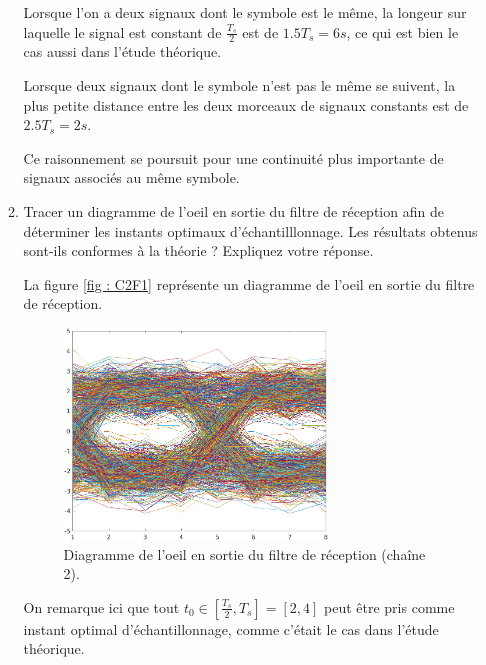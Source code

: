 \documentclass[frenchb]{article}
\begin{document}
\begin{enumerate}
\begin{enumerate}
				 Lorsque l'on a deux signaux dont le symbole est le même, la longeur sur laquelle le signal est constant de $\frac{T_s}{2}$ est de $1.5 T_s = 6s$, ce qui est bien le cas aussi dans l'étude théorique.
				 
                Lorsque deux signaux dont le symbole n'est pas le même se suivent, la plus petite distance entre les deux morceaux de signaux constants est de $2.5 T_s = 2s$.
                
				Ce raisonnement se poursuit pour une continuité plus importante de signaux associés au même symbole. 
				 \par\leavevmode\par
                \item Tracer un diagramme de l'oeil en sortie du filtre de réception afin de déterminer les instants optimaux d'échantilllonnage. Les résultats obtenus sont-ils conformes à la théorie ? Expliquez votre réponse.
                \par\leavevmode\par
       			 \setlength\parindent{0.5cm}
        		 La figure \ref{fig : C2F1} représente  un diagramme de l'oeil en sortie du filtre de réception.
        
                 \begin{figure}[ht!]
		         \centering
		         \includegraphics[width=7cm]{C2F2.png}		              			     \caption{Diagramme de l'oeil en sortie du filtre de réception (chaîne 2). \label{fig : C2F2}}
		         \end{figure}
		        
		        \newpage
				 On remarque ici que tout $t_0 \in \left[\frac{T_s}{2}, T_s\right] = \left[2, 4\right]$ peut être pris comme instant optimal d'échantillonnage, comme c'était le cas dans l'étude théorique. 
				 

\end{enumerate}
\end{enumerate}
\end{document}
